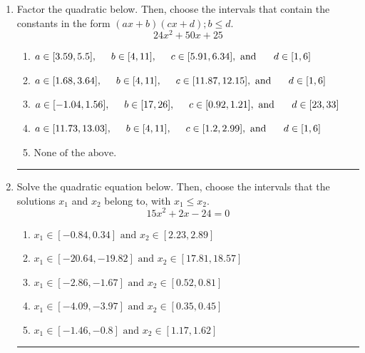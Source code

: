 \documentclass[14pt]{extbook}
\newcommand{\litem}[1]{\item#1\hspace*{-1cm}\rule{\textwidth}{0.4pt}}
\begin{document}
\begin{enumerate}
{\begin{enumerate}[label=\Alph*.]
\end{enumerate} }
\litem{
Factor the quadratic below. Then, choose the intervals that contain the constants in the form $(ax+b)(cx+d); b \leq d.$\[ 24x^{2} +50 x + 25 \]\begin{enumerate}[label=\Alph*.]
\item \( a \in [3.59, 5.5], \hspace*{5mm} b \in [4, 11], \hspace*{5mm} c \in [5.91, 6.34], \text{ and } \hspace*{5mm} d \in [1, 6] \)
\item \( a \in [1.68, 3.64], \hspace*{5mm} b \in [4, 11], \hspace*{5mm} c \in [11.87, 12.15], \text{ and } \hspace*{5mm} d \in [1, 6] \)
\item \( a \in [-1.04, 1.56], \hspace*{5mm} b \in [17, 26], \hspace*{5mm} c \in [0.92, 1.21], \text{ and } \hspace*{5mm} d \in [23, 33] \)
\item \( a \in [11.73, 13.03], \hspace*{5mm} b \in [4, 11], \hspace*{5mm} c \in [1.2, 2.99], \text{ and } \hspace*{5mm} d \in [1, 6] \)
\item \( \text{None of the above.} \)

\end{enumerate} }
\litem{
Solve the quadratic equation below. Then, choose the intervals that the solutions $x_1$ and $x_2$ belong to, with $x_1 \leq x_2$.\[ 15x^{2} +2 x -24 = 0 \]\begin{enumerate}[label=\Alph*.]
\item \( x_1 \in [-0.84, 0.34] \text{ and } x_2 \in [2.23, 2.89] \)
\item \( x_1 \in [-20.64, -19.82] \text{ and } x_2 \in [17.81, 18.57] \)
\item \( x_1 \in [-2.86, -1.67] \text{ and } x_2 \in [0.52, 0.81] \)
\item \( x_1 \in [-4.09, -3.97] \text{ and } x_2 \in [0.35, 0.45] \)
\item \( x_1 \in [-1.46, -0.8] \text{ and } x_2 \in [1.17, 1.62] \)


\end{enumerate}}
\end{enumerate}
\end{document}
